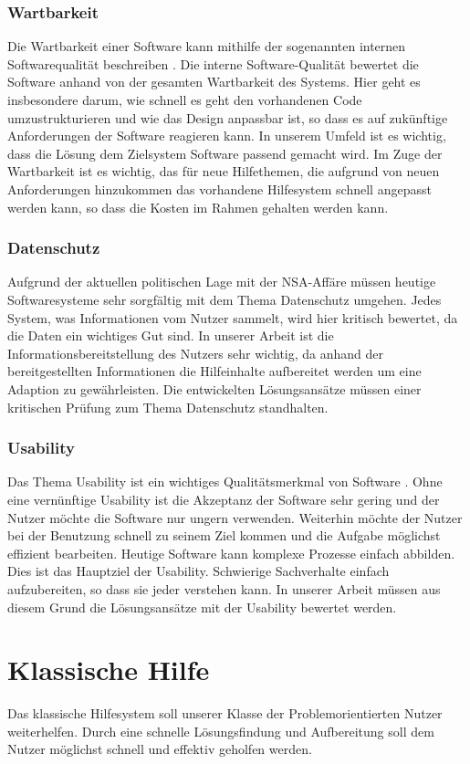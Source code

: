 \subsubsection{Wartbarkeit}
Die Wartbarkeit einer Software kann mithilfe der sogenannten internen Softwarequalität beschreiben \cite{softQuali}. Die interne Software-Qualität bewertet die Software anhand von der gesamten Wartbarkeit des Systems. Hier geht es insbesondere darum, wie schnell es geht den vorhandenen Code umzustrukturieren und wie das Design anpassbar ist, so dass es auf zukünftige Anforderungen der Software reagieren kann. In unserem Umfeld ist es wichtig, dass die Lösung dem Zielsystem Software passend gemacht wird. Im Zuge der Wartbarkeit ist es wichtig, das für neue Hilfethemen, die aufgrund von neuen Anforderungen hinzukommen das vorhandene Hilfesystem schnell angepasst werden kann, so dass die Kosten im Rahmen gehalten werden kann.
\subsubsection{Datenschutz}
Aufgrund der aktuellen politischen Lage mit der NSA-Affäre müssen heutige Softwaresysteme sehr sorgfältig mit dem Thema Datenschutz umgehen. Jedes System, was Informationen vom Nutzer sammelt, wird hier kritisch bewertet, da die Daten ein wichtiges Gut sind. In unserer Arbeit ist die Informationsbereitstellung des Nutzers sehr wichtig, da anhand der bereitgestellten Informationen die Hilfeinhalte aufbereitet werden um eine Adaption zu gewährleisten. Die entwickelten Lösungsansätze müssen einer kritischen Prüfung zum Thema Datenschutz standhalten.
\subsubsection{Usability}
Das Thema Usability ist ein wichtiges Qualitätsmerkmal von Software \cite{usability}. Ohne eine vernünftige Usability ist die Akzeptanz der Software sehr gering und der Nutzer möchte die Software nur ungern verwenden. Weiterhin möchte der Nutzer bei der Benutzung schnell zu seinem Ziel kommen und die Aufgabe möglichst effizient bearbeiten. Heutige Software kann komplexe Prozesse einfach abbilden. Dies ist das Hauptziel der Usability. Schwierige Sachverhalte einfach aufzubereiten, so dass sie jeder verstehen kann. In unserer Arbeit müssen aus diesem Grund die Lösungsansätze mit der Usability bewertet werden.

\section{Klassische Hilfe}
Das klassische Hilfesystem soll unserer Klasse der Problemorientierten Nutzer weiterhelfen. Durch eine schnelle Lösungsfindung und Aufbereitung soll dem Nutzer möglichst schnell und effektiv geholfen werden. 

